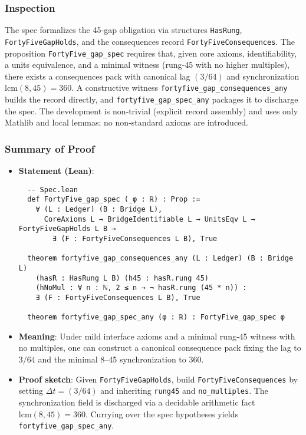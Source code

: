 \documentclass{article}
\begin{document}
\subsubsection{Inspection}
The spec formalizes the 45‑gap obligation via structures \texttt{HasRung}, \texttt{FortyFiveGapHolds}, and the consequences record \texttt{FortyFiveConsequences}. The proposition \texttt{FortyFive\_gap\_spec} requires that, given core axioms, identifiability, a units equivalence, and a minimal witness (rung‑45 with no higher multiples), there exists a consequences pack with canonical lag \((3/64)\) and synchronization \(\mathrm{lcm}(8,45)=360\). A constructive witness \texttt{fortyfive\_gap\_consequences\_any} builds the record directly, and \texttt{fortyfive\_gap\_spec\_any} packages it to discharge the spec. The development is non‑trivial (explicit record assembly) and uses only Mathlib and local lemmas; no non‑standard axioms are introduced.

\subsubsection{Summary of Proof}
\begin{itemize}[leftmargin=*]
  \item \textbf{Statement (Lean)}:
  \begin{lstlisting}
  -- Spec.lean
  def FortyFive_gap_spec (_φ : ℝ) : Prop :=
    ∀ (L : Ledger) (B : Bridge L),
      CoreAxioms L → BridgeIdentifiable L → UnitsEqv L → FortyFiveGapHolds L B →
        ∃ (F : FortyFiveConsequences L B), True

  theorem fortyfive_gap_consequences_any (L : Ledger) (B : Bridge L)
    (hasR : HasRung L B) (h45 : hasR.rung 45)
    (hNoMul : ∀ n : ℕ, 2 ≤ n → ¬ hasR.rung (45 * n)) :
    ∃ (F : FortyFiveConsequences L B), True

  theorem fortyfive_gap_spec_any (φ : ℝ) : FortyFive_gap_spec φ
  \end{lstlisting}
  \item \textbf{Meaning}: Under mild interface axioms and a minimal rung‑45 witness with no multiples, one can construct a canonical consequence pack fixing the lag to \(3/64\) and the minimal 8–45 synchronization to 360.
  \item \textbf{Proof sketch}: Given \texttt{FortyFiveGapHolds}, build \texttt{FortyFiveConsequences} by setting \(\Delta t=(3/64)\) and inheriting \texttt{rung45} and \texttt{no\_multiples}. The synchronization field is discharged via a decidable arithmetic fact \(\mathrm{lcm}(8,45)=360\). Currying over the spec hypotheses yields \texttt{fortyfive\_gap\_spec\_any}.
\end{itemize}
\end{document}
